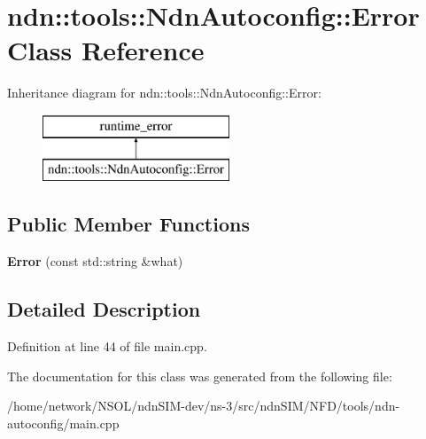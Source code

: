 \hypertarget{classndn_1_1tools_1_1NdnAutoconfig_1_1Error}{}\section{ndn\+:\+:tools\+:\+:Ndn\+Autoconfig\+:\+:Error Class Reference}
\label{classndn_1_1tools_1_1NdnAutoconfig_1_1Error}
Inheritance diagram for ndn\+:\+:tools\+:\+:Ndn\+Autoconfig\+:\+:Error\+:\begin{figure}[H]
\begin{center}
\leavevmode
\includegraphics[height=2.000000cm]{classndn_1_1tools_1_1NdnAutoconfig_1_1Error}
\end{center}
\end{figure}
\subsection*{Public Member Functions}
\begin{DoxyCompactItemize}
\item 
{\bfseries Error} (const std\+::string \&what)\hypertarget{classndn_1_1tools_1_1NdnAutoconfig_1_1Error_a56a2ae832f4e65e2e4faf81c0258e36d}{}\label{classndn_1_1tools_1_1NdnAutoconfig_1_1Error_a56a2ae832f4e65e2e4faf81c0258e36d}

\end{DoxyCompactItemize}


\subsection{Detailed Description}


Definition at line 44 of file main.\+cpp.



The documentation for this class was generated from the following file\+:\begin{DoxyCompactItemize}
\item 
/home/network/\+N\+S\+O\+L/ndn\+S\+I\+M-\/dev/ns-\/3/src/ndn\+S\+I\+M/\+N\+F\+D/tools/ndn-\/autoconfig/main.\+cpp\end{DoxyCompactItemize}
